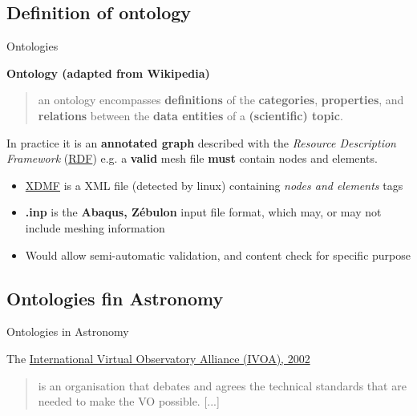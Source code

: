 \documentclass[10pt,compress,serif,aspectratio=169]{beamer}
\begin{document}
\subsection{Definition of ontology}
\begin{frame}[t]{Ontologies}

    \textbf{Ontology (adapted from Wikipedia)}
\begin{quote}
an ontology encompasses \textbf{definitions} of the \textbf{categories}, \textbf{properties}, and \textbf{relations} between the \textbf{data entities} of a \textbf{(scientific) topic}.
  \end{quote}
\pause
\vfill
\begin{minipage}{.4\textwidth}
In practice it is an \textbf{annotated graph} described with the \textit{Resource Description Framework}  (\href{https://www.techtarget.com/searchapparchitecture/definition/Resource-Description-Framework-RDF}{RDF})\newline
\pause
\vfill
e.g. a {\huge \textbf{valid}} mesh file {\huge\textbf{must}} contain nodes and elements. 
\end{minipage}
\begin{minipage}{.56\textwidth}
\begin{center}
\end{center}
\end{minipage}

\vfill
\pause
\begin{itemize}
  \item \href{https://www.xdmf.org/index.php/XDMF_Model_and_Format}{XDMF} is a XML file (detected by linux) containing \textit{nodes and elements} tags
  \item \textbf{.inp} is the \textbf{Abaqus, Zébulon} input file format, which may, or may not include meshing information
\pause
  \item \alert{Would allow semi-automatic validation, and content check for specific purpose}
\end{itemize}
\vfill
  \end{frame}


\subsection{Ontologies fin Astronomy}
\begin{frame}[t]{Ontologies in Astronomy}
    
The \href{https://www.ivoa.net/rdf/}{International Virtual Observatory Alliance (IVOA), 2002}
\begin{quote}
    is an organisation that debates and agrees the technical standards that are needed to make the VO possible. [...]
  \end{quote}
\begin{center}
\end{center}
\end{frame}
\end{document}
